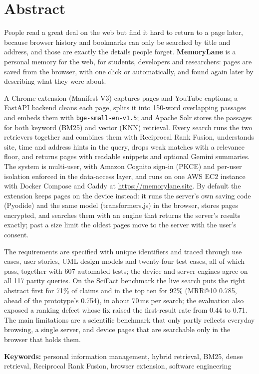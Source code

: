 
\chapter*{Abstract}

People read a great deal on the web but find it hard to return to a page
later, because browser history and bookmarks can only be searched by title
and address, and those are exactly the details people forget.
\textbf{MemoryLane} is a personal memory for the web, for students,
developers and researchers: pages are saved from the browser, with one click
or automatically, and found again later by describing what they were about.

A Chrome extension (Manifest V3) captures pages and YouTube captions; a
FastAPI backend cleans each page, splits it into 150-word overlapping
passages and embeds them with \texttt{bge-small-en-v1.5}; and Apache Solr
stores the passages for both keyword (BM25) and vector (KNN) retrieval. Every
search runs the two retrievers together and combines them with Reciprocal
Rank Fusion, understands site, time and address hints in the query, drops
weak matches with a relevance floor, and returns pages with readable snippets
and optional Gemini summaries. The system is multi-user, with Amazon Cognito
sign-in (PKCE) and per-user isolation enforced in the data-access layer, and
runs on one AWS EC2 instance with Docker Compose and Caddy at
\url{https://memorylane.site}. By default the extension keeps pages on the
device instead: it runs the server's own saving code (Pyodide) and the same
model (transformers.js) in the browser, stores pages encrypted, and searches
them with an engine that returns the server's results exactly; past a size
limit the oldest pages move to the server with the user's consent.

The requirements are specified with unique identifiers and traced through
use cases, user stories, UML design models and twenty-four test cases, all
of which pass, together with 607 automated tests; the device and server
engines agree on all 117 parity queries. On the SciFact benchmark the
live search puts the right abstract first for 71\% of claims and in the top
ten for 92\% (MRR@10 0.785, ahead of the prototype's 0.754), in about 70\,ms
per search; the evaluation also exposed a ranking defect whose fix raised the
first-result rate from 0.44 to 0.71. The main limitations are a scientific
benchmark that only partly reflects everyday browsing, a single server, and
device pages that are searchable only in the browser that holds them.

\vspace{1em}
\noindent\textbf{Keywords:} personal information management, hybrid
retrieval, BM25, dense retrieval, Reciprocal Rank Fusion, browser extension,
software engineering
